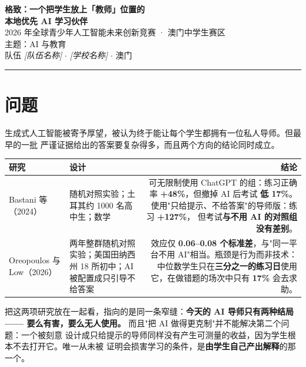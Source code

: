 \documentclass[11pt,a4paper,UTF8,fontset=windows]{ctexart}
\begin{document}
\begin{center}
{\LARGE\bfseries 格致：一个把学生放上「教师」位置的\\[2pt]
本地优先 AI 学习伙伴}\\[7pt]
{\small 2026 年全球青少年人工智能未来创新竞赛 · 澳门中学生赛区\\
主题：AI 与教育}\\[4pt]
{\footnotesize 队伍 \textit{[队伍名称]} $\cdot$ \textit{[学校名称]} $\cdot$ 澳门}
\end{center}
\vspace{-2pt}
\hrule
\vspace{5pt}

\section{问题}

生成式人工智能被寄予厚望，被认为终于能让每个学生都拥有一位私人导师。但最早的一批
严谨证据给出的答案要复杂得多，而且两个方向的结论同时成立。

\begin{table}[h]
\centering
\small
\begin{tabularx}{\textwidth}{@{}p{2.6cm} p{3.5cm} R@{}}
\toprule
\textbf{研究} & \textbf{设计} & \textbf{结论} \\
\midrule
Bastani 等（2024） &
随机对照实验；土耳其约 1000 名高中生；数学 &
可无限制使用 ChatGPT 的组：练习正确率 \textbf{+48\%}，但撤掉 AI 后考试
\textbf{低 17\%}。使用"只给提示、不给答案"的导师版：练习 \textbf{+127\%}，
但考试\textbf{与不用 AI 的对照组没有差别}。 \\[2pt]
Oreopoulos 与 Low（2026） &
两年整群随机对照实验；美国田纳西州 18 所初中；AI 被配置成只引导不给答案 &
效应仅 \textbf{0.06--0.08 个标准差}，与"同一平台不用 AI"相当。瓶颈是行为而非技术：
中位数学生只在\textbf{三分之一的练习日}使用它，在做错题的场次中只有
\textbf{17\%} 会去求助。 \\
\bottomrule
\end{tabularx}
\end{table}

\vspace{-4pt}
把这两项研究放在一起看，指向的是同一条窄缝：\textbf{今天的 AI 导师只有两种结局——
要么有害，要么无人使用。} 而且"把 AI 做得更克制"并不能解决第二个问题：一个被刻意
设计成只给提示的导师同样没有产生可测量的收益，因为学生根本不去打开它。唯一从未被
证明会损害学习的条件，是\textbf{由学生自己产出解释}的那一个。
\end{document}
